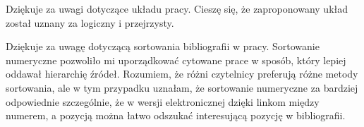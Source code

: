 \begin{frame}[t]
    \begin{block}{\tb}
\end{block}

\begin{block}{\tb}
\end{block}

Dziękuje za uwagi dotyczące układu  pracy. Cieszę się, że zaproponowany  układ został uznany za logiczny i przejrzysty. 


\begin{block}{\tb}
\end{block}

Dziękuje za uwagę dotyczącą sortowania bibliografii w pracy. 
Sortowanie numeryczne pozwoliło mi uporządkować cytowane prace w sposób, który lepiej oddawał hierarchię źródeł. 
Rozumiem, że różni czytelnicy preferują różne metody sortowania, ale w tym przypadku uznałam, że sortowanie numeryczne za bardziej odpowiednie szczególnie, że w wersji elektronicznej dzięki linkom między numerem, a pozycją można łatwo odszukać interesującą pozycję w bibliografii.


\end{frame}





